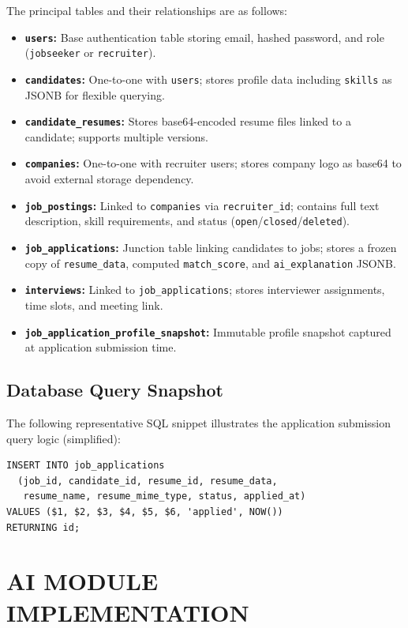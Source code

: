 \documentclass[12pt,a4paper]{report}
\begin{document}
The principal tables and their relationships are as follows:

\begin{itemize}[leftmargin=*, itemsep=2pt]
    \item \textbf{\texttt{users}:} Base authentication table storing email, hashed password, and role (\texttt{jobseeker} or \texttt{recruiter}).
    \item \textbf{\texttt{candidates}:} One-to-one with \texttt{users}; stores profile data including \texttt{skills} as JSONB for flexible querying.
    \item \textbf{\texttt{candidate\_resumes}:} Stores base64-encoded resume files linked to a candidate; supports multiple versions.
    \item \textbf{\texttt{companies}:} One-to-one with recruiter users; stores company logo as base64 to avoid external storage dependency.
    \item \textbf{\texttt{job\_postings}:} Linked to \texttt{companies} via \texttt{recruiter\_id}; contains full text description, skill requirements, and status (\texttt{open}/\texttt{closed}/\texttt{deleted}).
    \item \textbf{\texttt{job\_applications}:} Junction table linking candidates to jobs; stores a frozen copy of \texttt{resume\_data}, computed \texttt{match\_score}, and \texttt{ai\_explanation} JSONB.
    \item \textbf{\texttt{interviews}:} Linked to \texttt{job\_applications}; stores interviewer assignments, time slots, and meeting link.
    \item \textbf{\texttt{job\_application\_profile\_snapshot}:} Immutable profile snapshot captured at application submission time.
\end{itemize}

\subsection{Database Query Snapshot}

The following representative SQL snippet illustrates the application submission query logic (simplified):

\begin{verbatim}
INSERT INTO job_applications
  (job_id, candidate_id, resume_id, resume_data,
   resume_name, resume_mime_type, status, applied_at)
VALUES ($1, $2, $3, $4, $5, $6, 'applied', NOW())
RETURNING id;
\end{verbatim}

\section{AI MODULE IMPLEMENTATION}
\end{document}
